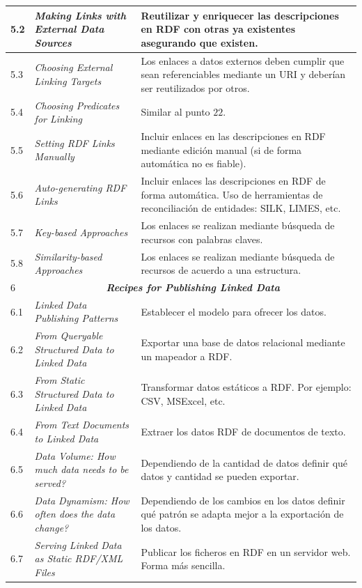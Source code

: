 \begin{longtable}[c]{|l|p{6.5cm}|p{7.5cm}|}
   5.2 &  \textit{Making Links with External Data Sources} &  Reutilizar y enriquecer las descripciones en RDF con otras ya existentes asegurando que existen.\\ \hline
   5.3 &  \textit{Choosing External Linking Targets} & Los enlaces a datos externos deben cumplir que sean referenciables mediante un URI y deberían ser reutilizados por otros.\\ \hline
   5.4 &  \textit{Choosing Predicates for Linking} & Similar al punto $22$.\\ \hline
   5.5 &  \textit{Setting RDF Links Manually} & Incluir enlaces en las descripciones en RDF mediante edición manual (si de forma automática no es fiable).\\ \hline
   5.6 &  \textit{Auto-generating RDF Links} & Incluir enlaces las descripciones en RDF de forma automática. Uso de herramientas de reconciliación de entidades: SILK, LIMES, etc.\\ \hline
   5.7 &  \textit{Key-based Approaches} & Los enlaces se realizan mediante búsqueda de recursos con palabras claves.\\ \hline
   5.8 &  \textit{Similarity-based Approaches} & Los enlaces se realizan mediante búsqueda de recursos de acuerdo a una estructura.\\ \hline
  6&\multicolumn{2}{|c|}{\textbf{\textit{Recipes for Publishing Linked Data}}}\\ \hline
   6.1 &  \textit{Linked Data Publishing Patterns} & Establecer el modelo para ofrecer los datos.\\ \hline
   6.2 &  \textit{From Queryable Structured Data to Linked Data} & Exportar una base de datos relacional mediante un mapeador a RDF.\\ \hline
   6.3 &  \textit{From Static Structured Data to Linked Data} & Transformar datos estáticos a RDF. Por ejemplo: CSV, MSExcel, etc.\\ \hline
   6.4 &  \textit{From Text Documents to Linked Data} & Extraer los datos RDF de documentos de texto.\\ \hline
   6.5 &  \textit{Data Volume: How much data needs to be served?} & Dependiendo de la cantidad de datos definir qué datos y cantidad se pueden exportar.\\ \hline
   6.6 &  \textit{Data Dynamism: How often does the data change?} & Dependiendo de los cambios en los datos definir qué patrón se adapta mejor a la exportación de los datos.\\ \hline
   6.7 &  \textit{Serving Linked Data as Static RDF/XML Files} & Publicar los ficheros en RDF en un servidor web. Forma más sencilla.\\ \hline

\end{longtable}
